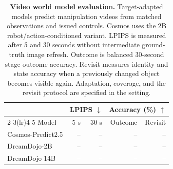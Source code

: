 \begin{table}[t]
\centering
\caption{\textbf{Video world model evaluation.}
Target-adapted models predict manipulation videos from matched observations
and issued controls. Cosmos uses the 2B robot/action-conditioned variant.
LPIPS is measured after 5 and 30 seconds without intermediate ground-truth
image refresh. Outcome is balanced 30-second stage-outcome accuracy.
Revisit measures identity and state accuracy when a previously changed object
becomes visible again. Adaptation, coverage, and the revisit protocol are
specified in the setting.}
\label{tab:worldedge_world_models}
\label{tab:worldedge_world_action_policies} %
\begingroup
\small
\setlength{\tabcolsep}{2pt}
\renewcommand{\arraystretch}{1.12}
\begin{tabular*}{\columnwidth}{@{\extracolsep{\fill}}lrrrr@{}}
\toprule
& \multicolumn{2}{c}{LPIPS $\downarrow$}
& \multicolumn{2}{c}{Accuracy (\%) $\uparrow$} \\
\cmidrule(lr){2-3}\cmidrule(lr){4-5}
Model & 5 s & 30 s & Outcome & Revisit \\
\midrule
Cosmos-Predict2.5 & -- & -- & -- & -- \\
DreamDojo-2B & -- & -- & -- & -- \\
DreamDojo-14B & -- & -- & -- & -- \\
\bottomrule
\end{tabular*}
\endgroup
\end{table}
